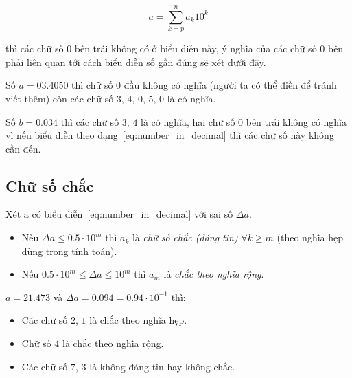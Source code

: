\documentclass[../../Lectures.tex]{subfiles}
\begin{document}
\begin{equation} \label{eq:number_in_decimal}
    a = \sum_{k=p}^{n} a_k10^k
\end{equation}

thì các chữ số \(0\) bên trái không có ở biểu diễn này, ý nghĩa của các chữ số
\(0\) bên phải liên quan tới cách biểu diễn số gần đúng sẽ xét dưới đây.

\begin{exmp}
    Số \(a = 03.4050\) thì chữ số \(0\) đầu không có nghĩa (người ta có thể điền
    để tránh viết thêm) còn các chữ số \(3\), \(4\), \(0\), \(5\), \(0\) là có
    nghĩa.

    Số \(b = 0.034\) thì các chữ số \(3\), \(4\) là có nghĩa, hai chữ số \(0\)
    bên trái không có nghĩa vì nếu biểu diễn theo dạng~\ref{eq:number_in_decimal}
    thì các chữ số này không cần đến.
\end{exmp}

\subsection{Chữ số chắc}

\begin{definition}
    Xét a có biểu diễn~\ref{eq:number_in_decimal} với sai số \(\Delta a\).

    \begin{itemize}
        \item Nếu \(\Delta a \leq \num{0.5} \cdot 10^m\) thì \(a_k\) là
            \emph{chữ số chắc (đáng tin)} \(\forall k \geq m\) (theo nghĩa hẹp
            dùng trong tính toán).
        \item Nếu \(\num{0.5} \cdot 10^m \leq \Delta a \leq 10^m\) thì \(a_m\)
            là \emph{chắc theo nghĩa rộng}.
    \end{itemize}
\end{definition}

\begin{exmp}
    \(a = \num{21.473}\) và \(\Delta a = \num{0.094} = \num{0.94} \cdot
    10^{-1}\) thì:

    \begin{itemize}
        \item Các chữ số \(2\), \(1\) là chắc theo nghĩa hẹp.
        \item Chữ số \(4\) là chắc theo nghĩa rộng.
        \item Các chữ số \(7\), \(3\) là không đáng tin hay không chắc.
    \end{itemize}
\end{exmp}
\end{document}
